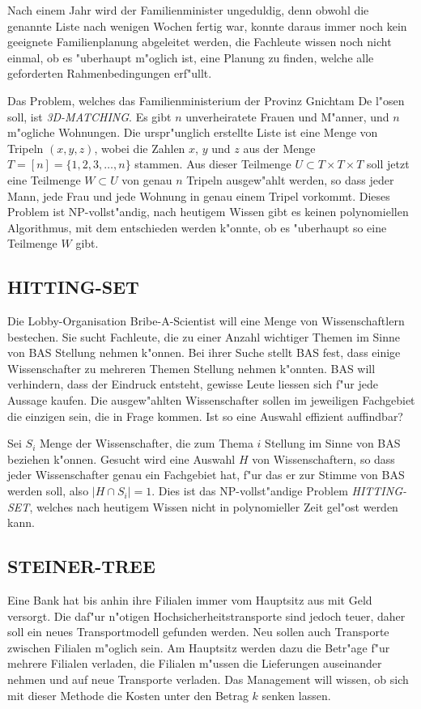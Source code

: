 Nach einem Jahr wird der Familienminister ungeduldig, denn obwohl die
genannte Liste nach wenigen Wochen fertig war, konnte daraus immer noch
kein geeignete Familienplanung abgeleitet werden, die Fachleute wissen
noch nicht einmal, ob es "uberhaupt m"oglich ist, eine Planung
zu finden, welche alle geforderten Rahmenbedingungen erf"ullt.

\medskip

Das Problem, welches das Familienministerium der Provinz Gnichtam De
l"osen soll, ist {\it 3D-MATCHING}. Es gibt $n$ unverheiratete Frauen
und M"anner, und $n$ m"ogliche Wohnungen. Die urspr"unglich erstellte
Liste ist eine Menge von Tripeln $(x,y,z)$, wobei die Zahlen $x$,
$y$ und $z$ aus der Menge $T=[n]=\{1,2,3,\dots,n\}$ stammen. Aus dieser
Teilmenge $U\subset T\times T\times T$ soll jetzt eine 
Teilmenge $W\subset U$ von genau $n$ Tripeln ausgew"ahlt werden, so dass
jeder Mann, jede Frau und jede Wohnung in genau einem Tripel vorkommt.
Dieses Problem ist NP-vollst"andig, 
nach heutigem Wissen gibt es keinen polynomiellen Algorithmus,
mit dem entschieden werden k"onnte, ob es "uberhaupt so eine Teilmenge
$W$ gibt.

\subsection{HITTING-SET}
Die Lobby-Organisation Bribe-A-Scientist will eine Menge von
Wissenschaftlern bestechen.
Sie sucht Fachleute, die zu einer Anzahl wichtiger Themen
im Sinne von BAS Stellung nehmen k"onnen.
Bei ihrer Suche stellt BAS fest, dass einige Wissenschafter
zu mehreren Themen Stellung nehmen k"onnten.
BAS will verhindern, dass der Eindruck entsteht, gewisse
Leute liessen sich f"ur jede Aussage kaufen.
Die ausgew"ahlten Wissenschafter sollen im jeweiligen Fachgebiet
die einzigen sein, die in Frage kommen.
Ist so eine Auswahl effizient auffindbar?

\medskip

Sei $S_i$ Menge der Wissenschafter, die zum Thema $i$ Stellung im
Sinne von BAS beziehen k"onnen. Gesucht wird eine Auswahl
$H$ von Wissenschaftern, so dass jeder Wissenschafter genau
ein Fachgebiet hat, f"ur das er zur Stimme von BAS werden soll,
also $|H\cap S_i|=1$.
Dies ist das NP-vollst"andige Problem {\it HITTING-SET}, welches
nach heutigem Wissen nicht in polynomieller Zeit gel"ost werden
kann.


\subsection{STEINER-TREE}
Eine Bank hat bis anhin ihre Filialen immer vom Hauptsitz aus mit
Geld versorgt. Die daf"ur n"otigen Hochsicherheitstransporte sind
jedoch teuer, daher soll ein neues Transportmodell gefunden werden.
Neu sollen auch Transporte zwischen Filialen m"oglich sein.
Am Hauptsitz werden dazu die Betr"age f"ur mehrere Filialen
verladen, die Filialen m"ussen die Lieferungen
auseinander nehmen und auf neue Transporte verladen. Das
Management will wissen, ob sich mit dieser Methode die
Kosten unter den Betrag $k$ senken lassen. 

